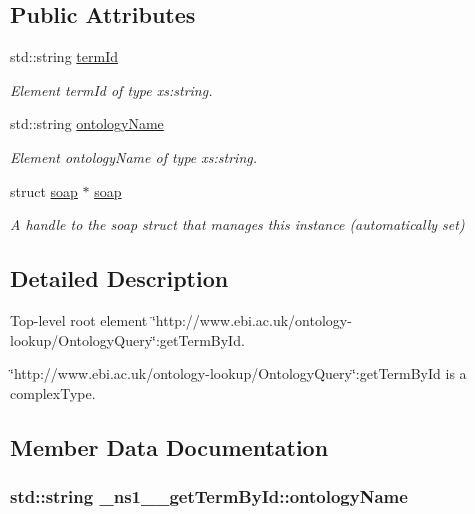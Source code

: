 \subsection*{Public Attributes}
\begin{DoxyCompactItemize}
\item 
std::string \hyperlink{class__ns1____getTermById_abdbe3c9275ace0d3306ce5df5dfdd836}{termId}
\begin{DoxyCompactList}\small\item\em Element termId of type xs:string. \end{DoxyCompactList}\item 
std::string \hyperlink{class__ns1____getTermById_aba28d6ff17fdd38b9c5b082ae647743e}{ontologyName}
\begin{DoxyCompactList}\small\item\em Element ontologyName of type xs:string. \end{DoxyCompactList}\item 
\hypertarget{class__ns1____getTermById_a1c19aee402989b99c765a399f4e7ee4c}{
struct \hyperlink{class__ns1____getTermById_a1c19aee402989b99c765a399f4e7ee4c}{soap} $\ast$ \hyperlink{class__ns1____getTermById_a1c19aee402989b99c765a399f4e7ee4c}{soap}}
\label{class__ns1____getTermById_a1c19aee402989b99c765a399f4e7ee4c}

\begin{DoxyCompactList}\small\item\em A handle to the soap struct that manages this instance (automatically set) \end{DoxyCompactList}\end{DoxyCompactItemize}


\subsection{Detailed Description}
Top-\/level root element \char`\"{}http://www.ebi.ac.uk/ontology-\/lookup/OntologyQuery\char`\"{}:getTermById. 

\char`\"{}http://www.ebi.ac.uk/ontology-\/lookup/OntologyQuery\char`\"{}:getTermById is a complexType. 

\subsection{Member Data Documentation}
\hypertarget{class__ns1____getTermById_aba28d6ff17fdd38b9c5b082ae647743e}{
\subsubsection[{ontologyName}]{\setlength{\rightskip}{0pt plus 5cm}std::string {\bf \_\-ns1\_\-\_\-getTermById::ontologyName}}}
\label{class__ns1____getTermById_aba28d6ff17fdd38b9c5b082ae647743e}


